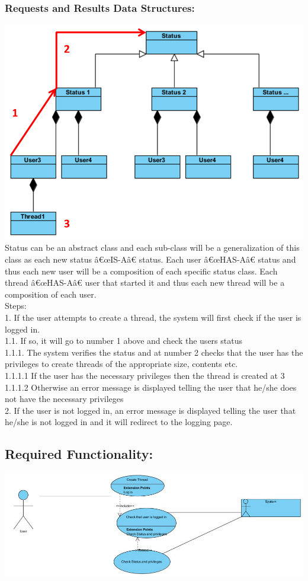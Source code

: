\documentclass[a4paper,11pt]{article}
\begin{document}
\subsubsection*{Requests and Results Data Structures:}
\includegraphics[width=\linewidth]{./Images/CRUDThread/Diagrams/1.png}
Status can be an abstract class and each sub-class will be a generalization of this class as each new status â€œIS-Aâ€ status.
Each user â€œHAS-Aâ€ status and thus each new user will be a composition of each specific status class.
Each thread â€œHAS-Aâ€ user that started it and thus each new thread will be a composition of each user.\\
Steps:\\
1.	If the user attempts to create a thread, the system will first check if the user is logged in.\\
1.1.	If so, it will go to number 1 above and check the users status\\
1.1.1.	The system verifies the status and at number 2 checks that the user has the privileges to create threads of the appropriate size, contents etc.\\
1.1.1.1	If the user has the necessary privileges then the thread is created at 3\\
1.1.1.2	Otherwise an error message is displayed telling the user that he/she does not have the necessary privileges \\
2.	If the user is not logged in, an error message is displayed telling the user that he/she is not logged in and it will redirect to the logging page.\\
\subsection{Required Functionality:} 
\includegraphics[width=\linewidth]{./Images/CRUDThread/Diagrams/2.jpg}
\end{document}
